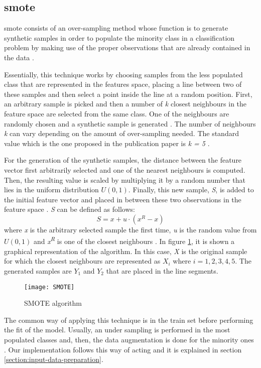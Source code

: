 
\subsection{\acrfull{smote}}
\label{subsection:smote}

	\acrshort{smote} consists of an over-sampling method whose function is to generate synthetic samples in order to populate the minority class in a classification problem by making use of the proper observations that are already contained in the data \cite{Chawla2002}. 
	
	Essentially, this technique works by choosing samples from the less populated class that are represented in the features space, placing a line between two of these samples and then select a point inside the line at a random position. First, an arbitrary sample is picked and then a number of \textit{k} closest neighbours in the feature space are selected from the same class. One of the neighbours are randomly chosen and a synthetic sample is generated \cite{Browniee2020}. The number of neighbours \textit{k} can vary depending on the amount of over-sampling needed. The standard value which is the one proposed in the publication paper is \textit{k = 5} \cite{Chawla2002}. 
	
	For the generation of the synthetic samples, the distance between the feature vector first arbitrarily selected and one of the nearest neighbours is computed. Then, the resulting value is scaled by multiplying it by a random number that lies in the uniform distribution $U(0,1)$. Finally, this new sample, \textit{S}, is added to the initial feature vector and placed in between these two observations in the feature space \cite{Chawla2002}. \textit{S} can be defined as follows:
	\[S = x + u\cdot(x^{R} - x) \]
	where \textit{x} is the arbitrary selected sample the first time, \textit{u} is the random value from $U(0,1)$ and \textit{x\textsuperscript{R}} is one of the closest neighbours \cite{Blagus2013}. In figure \ref{fig:mesh47}, it is shown a graphical representation of the algorithm. In this case, \textit{X} is the original sample for which the closest neighbours are represented as $X_{i}$ where $i=1,2,3,4,5$. The generated samples are $Y_{1}$ and $Y_{2}$ that are placed in the line segments.
	
	\begin{figure}
		\centering
		\captionsetup{justification=centering}
		\texttt{[image: SMOTE]}
		\caption{SMOTE algorithm \cite{Xie2015}}
		\label{fig:mesh47}
	\end{figure}

	The common way of applying this technique is in the train set before performing the fit of the model. Usually, an under sampling is performed in the most populated classes and, then, the data augmentation is done for the minority ones \cite{Browniee2020}. Our implementation follows this way of acting and it is explained in section \ref{section:input-data-preparation}.
	
	 
